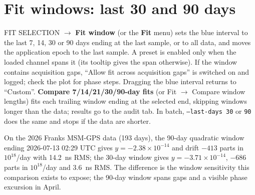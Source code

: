 \documentclass[11pt,a4paper]{article}
\begin{document}
\section{Fit windows: last 30 and 90 days}
FIT SELECTION $\rightarrow$ \textbf{Fit window} (or the \textbf{Fit} menu) sets the blue interval to the
last 7, 14, 30 or 90 days ending at the last sample, or to all data, and moves the application epoch to
the last sample. A preset is enabled only when the loaded channel spans it (its tooltip gives the span
otherwise). If the window contains acquisition gaps, ``Allow fit across acquisition gaps'' is switched
on and logged; check the plot for phase steps. Dragging the blue interval returns to ``Custom''.
\textbf{Compare 7/14/21/30/90-day fits} (or Fit $\rightarrow$ Compare window lengths) fits each trailing
window ending at the selected end, skipping windows longer than the data; results go to the audit tab.
In batch, \texttt{--last-days 30} or \texttt{90} does the same and stops if the data are shorter.

On the 2026 Franks MSM-GPS data (193 days), the 90-day quadratic window ending 2026-07-13 02:29 UTC
gives $y=-2.38\times10^{-14}$ and drift $-413$ parts in $10^{18}$/day with 14.2~ns RMS; the 30-day
window gives $y=-3.71\times10^{-14}$, $-686$ parts in $10^{18}$/day and 3.6~ns RMS. The difference is
the window sensitivity this comparison exists to expose; the 90-day window spans gaps and a visible
phase excursion in April.
\end{document}
